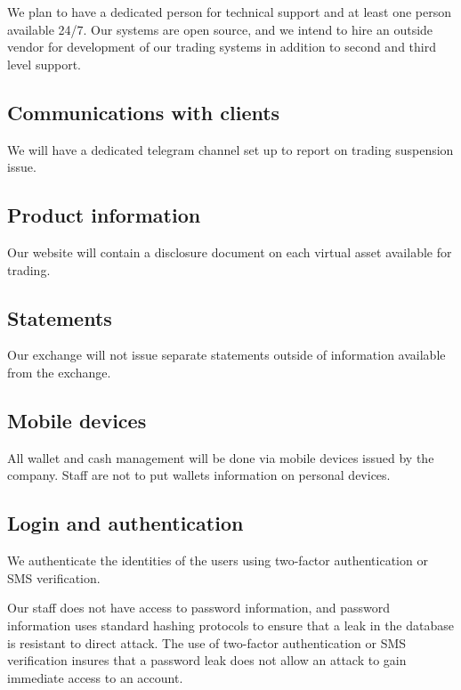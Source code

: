 We plan to have a dedicated person for technical support and at least
one person available 24/7.  Our systems are open source, and we intend
to hire an outside vendor for development of our trading systems in
addition to second and third level support.

\subsection{Communications with clients}
We will have a dedicated telegram channel set up to report on trading
suspension issue.

\subsection{Product information}
Our website will contain a disclosure document on each virtual asset
available for trading.

\subsection{Statements}
Our exchange will not issue separate statements outside of information
available from the exchange.

\subsection{Mobile devices}
All wallet and cash management will be done via mobile devices issued
by the company.  Staff are not to put wallets information on personal
devices.

\subsection{Login and authentication}

We authenticate the identities of the users using two-factor
authentication or SMS verification.

Our staff does not have access to password information, and password
information uses standard hashing protocols to ensure that a leak in
the database is resistant to direct attack.  The use of two-factor
authentication or SMS verification insures that a password leak does
not allow an attack to gain immediate access to an account.

